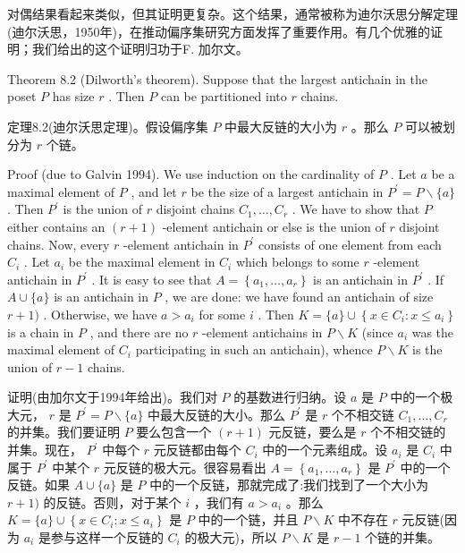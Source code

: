 \documentclass[10pt]{article}
\begin{document}
\begin{tcolorbox}\relax
对偶结果看起来类似，但其证明更复杂。这个结果，通常被称为迪尔沃思分解定理(迪尔沃思，1950年)，在推动偏序集研究方面发挥了重要作用。有几个优雅的证明；我们给出的这个证明归功于F. 加尔文。
\end{tcolorbox}

Theorem 8.2 (Dilworth's theorem). Suppose that the largest antichain in the poset \(P\) has size \(r\) . Then \(P\) can be partitioned into \(r\) chains.

\begin{tcolorbox}\relax
定理8.2(迪尔沃思定理)。假设偏序集 \(P\) 中最大反链的大小为 \(r\) 。那么 \(P\) 可以被划分为 \(r\) 个链。
\end{tcolorbox}

Proof (due to Galvin 1994). We use induction on the cardinality of \(P\) . Let \(a\) be a maximal element of \(P\) , and let \(r\) be the size of a largest antichain in \({P}^{\prime } = P \smallsetminus  \{ a\}\) . Then \({P}^{\prime }\) is the union of \(r\) disjoint chains \({C}_{1},\ldots ,{C}_{r}\) . We have to show that \(P\) either contains an \(\left( {r + 1}\right)\) -element antichain or else is the union of \(r\) disjoint chains. Now, every \(r\) -element antichain in \({P}^{\prime }\) consists of one element from each \({C}_{i}\) . Let \({a}_{i}\) be the maximal element in \({C}_{i}\) which belongs to some \(r\) -element antichain in \({P}^{\prime }\) . It is easy to see that \(A = \left\{  {{a}_{1},\ldots ,{a}_{r}}\right\}\) is an antichain in \({P}^{\prime }\) . If \(A \cup  \{ a\}\) is an antichain in \(P\) , we are done: we have found an antichain of size \(r + 1)\) . Otherwise, we have \(a > {a}_{i}\) for some \(i\) . Then \(K = \{ a\}  \cup  \left\{  {x \in  {C}_{i} : x \leq  {a}_{i}}\right\}\) is a chain in \(P\) , and there are no \(r\) -element antichains in \(P \smallsetminus  K\) (since \({a}_{i}\) was the maximal element of \({C}_{i}\) participating in such an antichain), whence \(P \smallsetminus  K\) is the union of \(r - 1\) chains.

\begin{tcolorbox}\relax
证明(由加尔文于1994年给出)。我们对 \(P\) 的基数进行归纳。设 \(a\) 是 \(P\) 中的一个极大元， \(r\) 是 \({P}^{\prime } = P \smallsetminus  \{ a\}\) 中最大反链的大小。那么 \({P}^{\prime }\) 是 \(r\) 个不相交链 \({C}_{1},\ldots ,{C}_{r}\) 的并集。我们要证明 \(P\) 要么包含一个 \(\left( {r + 1}\right)\) 元反链，要么是 \(r\) 个不相交链的并集。现在， \({P}^{\prime }\) 中每个 \(r\) 元反链都由每个 \({C}_{i}\) 中的一个元素组成。设 \({a}_{i}\) 是 \({C}_{i}\) 中属于 \({P}^{\prime }\) 中某个 \(r\) 元反链的极大元。很容易看出 \(A = \left\{  {{a}_{1},\ldots ,{a}_{r}}\right\}\) 是 \({P}^{\prime }\) 中的一个反链。如果 \(A \cup  \{ a\}\) 是 \(P\) 中的一个反链，那就完成了:我们找到了一个大小为 \(r + 1)\) 的反链。否则，对于某个 \(i\) ，我们有 \(a > {a}_{i}\) 。那么 \(K = \{ a\}  \cup  \left\{  {x \in  {C}_{i} : x \leq  {a}_{i}}\right\}\) 是 \(P\) 中的一个链，并且 \(P \smallsetminus  K\) 中不存在 \(r\) 元反链(因为 \({a}_{i}\) 是参与这样一个反链的 \({C}_{i}\) 的极大元)，所以 \(P \smallsetminus  K\) 是 \(r - 1\) 个链的并集。
\end{tcolorbox}
\end{document}
